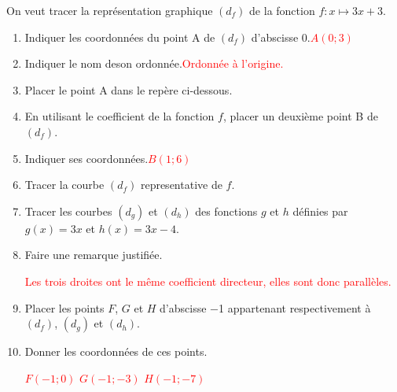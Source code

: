 \begin{corrige}
    On veut tracer la représentation graphique $(d_f)$ de la fonction $f : x\longmapsto 3x + 3$.

    \begin{enumerate}
        \item Indiquer les coordonnées du point A de $(d_f)$ d’abscisse 0.\hfill\textcolor{red}{$A(0;3)$}
        \item Indiquer le nom deson ordonnée.\textcolor{red}{Ordonnée à l'origine.}
        \item Placer le point A dans le repère ci-dessous.
        \item En utilisant le coefficient de la fonction $f$, placer un deuxième point B de $(d_f)$.
        \item Indiquer ses coordonnées.\hfill\textcolor{red}{$B(1;6)$}
        \item Tracer la courbe $(d_f)$ representative de $f$.
        
        \scalebox{1}{%
            \Fonction[%
                Trace,%
                Calcul={3x+3,3x,3x-4},%
                CouleurTrace={red,red,red},%
                Bornea={-3,-3,-3},%
                Borneb={3 ,3 ,3 },%
                LabelC={0.1,0.15,0.9},%
                NomCourbe={\textcolor{red}{$(d_f)$},\textcolor{red}{$(d_g)$},\textcolor{red}{$(d_h)$}},%
                Ymin=-3.5,Ymax=3.5,Ystep=2,%
                Xmin=-2.5,Xmax=2.5,Xstep=1,%
                Origine={(2.5,3.5)},%
                PasGrilleX=0.5,PasGrilleY=0.5,%
                Grille,%
                Traces={%
                    dotlabel.bot(btex \num{1} etex,placepoint(1,0));
                    dotlabel.lft(btex \num{1} etex,placepoint(0,1));
                    drawoptions(withcolor red);
                    dotlabel.rt(btex $B$ etex,placepoint(1,6));
                    dotlabel.lrt(btex $A$ etex,placepoint(0,3));
                    dotlabel.ulft(btex $F$ etex,placepoint(-1,0));
                    dotlabel.ulft(btex $G$ etex,placepoint(-1,-3));
                    dotlabel.ulft(btex $H$ etex,placepoint(-1,-7));
                    drawarrow placepoint(0,3)--placepoint(1,3) dashed evenly;
                    drawarrow placepoint(1,3)--placepoint(1,6) dashed evenly;
                }
            ]{}
        }
        \item Tracer les courbes $(d_g)$ et $(d_h)$ des fonctions $g$ et $h$ définies par $g(x)=3x$ et $h(x)=3x-4$.
        \item Faire une remarque justifiée.
        
        \textcolor{red}{Les trois droites ont le même coefficient directeur, elles sont donc parallèles.}
        \item Placer les points $F$, $G$ et $H$ d'abscisse \num{-1} appartenant respectivement à $(d_f)$, $(d_g)$ et $(d_h)$.
        \item Donner les coordonnées de ces points.
        
        \textcolor{red}{$F(-1;0)$ $G(-1;-3)$ $H(-1;-7)$}
    \end{enumerate}
\end{corrige}
